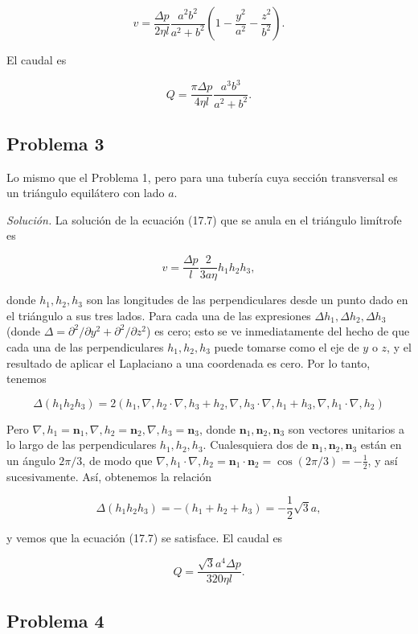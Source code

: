 \documentclass{article}
\begin{document}
$$
v = \frac{\Delta p}{2\eta l} \frac{a^2 b^2}{a^2 + b^2} \left( 1 - \frac{y^2}{a^2} - \frac{z^2}{b^2} \right).
$$

El caudal es

$$
Q = \frac{\pi \Delta p}{4\eta l} \frac{a^3 b^3}{a^2 + b^2}.
$$

\subsection*{Problema 3}

Lo mismo que el Problema 1, pero para una tubería cuya sección transversal es un triángulo equilátero con lado $a$.

\textit{Solución.} La solución de la ecuación (17.7) que se anula en el triángulo limítrofe es

$$
v = \frac{\Delta p}{l} \frac{2}{3a\eta} h_1 h_2 h_3,
$$

donde $h_1, h_2, h_3$ son las longitudes de las perpendiculares desde un punto dado en el triángulo a sus tres lados. Para cada una de las expresiones $\Delta h_1, \Delta h_2, \Delta h_3$ (donde $\Delta = \partial^2/\partial y^2 + \partial^2/\partial z^2$) es cero; esto se ve inmediatamente del hecho de que cada una de las perpendiculares $h_1, h_2, h_3$ puede tomarse como el eje de $y$ o $z$, y el resultado de aplicar el Laplaciano a una coordenada es cero. Por lo tanto, tenemos

$$
\Delta (h_1 h_2 h_3) = 2(h_1 , \nabla , h_2 \cdot \nabla , h_3 + h_2 , \nabla , h_3 \cdot \nabla , h_1 + h_3 , \nabla , h_1 \cdot \nabla , h_2)
$$

Pero $\nabla , h_1 = \mathbf{n}_1, \nabla , h_2 = \mathbf{n}_2, \nabla , h_3 = \mathbf{n}_3$, donde $\mathbf{n}_1, \mathbf{n}_2, \mathbf{n}_3$ son vectores unitarios a lo largo de las perpendiculares $h_1, h_2, h_3$. Cualesquiera dos de $\mathbf{n}_1, \mathbf{n}_2, \mathbf{n}_3$ están en un ángulo $2\pi/3$, de modo que $\nabla , h_1 \cdot \nabla , h_2 = \mathbf{n}_1 \cdot \mathbf{n}_2 = \cos(2\pi/3) = -\frac{1}{2}$, y así sucesivamente. Así, obtenemos la relación

$$
\Delta (h_1 h_2 h_3) = -(h_1 + h_2 + h_3) = -\frac{1}{2} \sqrt{3} a,
$$

y vemos que la ecuación (17.7) se satisface. El caudal es

$$
Q = \frac{\sqrt{3} a^4 \Delta p}{320 \eta l}.
$$

\subsection*{Problema 4}
\end{document}
